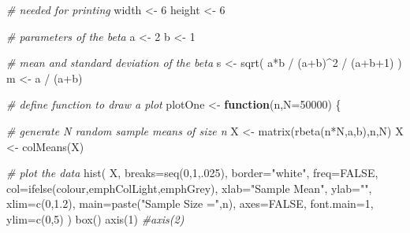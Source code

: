 \documentclass[
]{book}
\newenvironment{Shaded}{\begin{snugshade}}{\end{snugshade}}
\newcommand{\AttributeTok}[1]{\textcolor[rgb]{0.77,0.63,0.00}{#1}}
\newcommand{\CommentTok}[1]{\textcolor[rgb]{0.56,0.35,0.01}{\textit{#1}}}
\newcommand{\ConstantTok}[1]{\textcolor[rgb]{0.00,0.00,0.00}{#1}}
\newcommand{\ControlFlowTok}[1]{\textcolor[rgb]{0.13,0.29,0.53}{\textbf{#1}}}
\newcommand{\DecValTok}[1]{\textcolor[rgb]{0.00,0.00,0.81}{#1}}
\newcommand{\FloatTok}[1]{\textcolor[rgb]{0.00,0.00,0.81}{#1}}
\newcommand{\FunctionTok}[1]{\textcolor[rgb]{0.00,0.00,0.00}{#1}}
\newcommand{\NormalTok}[1]{#1}
\newcommand{\OtherTok}[1]{\textcolor[rgb]{0.56,0.35,0.01}{#1}}
\newcommand{\SpecialCharTok}[1]{\textcolor[rgb]{0.00,0.00,0.00}{#1}}
\newcommand{\StringTok}[1]{\textcolor[rgb]{0.31,0.60,0.02}{#1}}
\begin{document}
\begin{Shaded}
\begin{Highlighting}[]
    \CommentTok{\# needed for printing}
\NormalTok{    width }\OtherTok{\textless{}{-}} \DecValTok{6}
\NormalTok{    height }\OtherTok{\textless{}{-}} \DecValTok{6} 
    
    \CommentTok{\# parameters of the beta}
\NormalTok{    a }\OtherTok{\textless{}{-}} \DecValTok{2}
\NormalTok{    b }\OtherTok{\textless{}{-}} \DecValTok{1}
    
    \CommentTok{\# mean and standard deviation of the beta}
\NormalTok{    s }\OtherTok{\textless{}{-}} \FunctionTok{sqrt}\NormalTok{( a}\SpecialCharTok{*}\NormalTok{b }\SpecialCharTok{/}\NormalTok{ (a}\SpecialCharTok{+}\NormalTok{b)}\SpecialCharTok{\^{}}\DecValTok{2} \SpecialCharTok{/}\NormalTok{ (a}\SpecialCharTok{+}\NormalTok{b}\SpecialCharTok{+}\DecValTok{1}\NormalTok{) )}
\NormalTok{    m }\OtherTok{\textless{}{-}}\NormalTok{ a }\SpecialCharTok{/}\NormalTok{ (a}\SpecialCharTok{+}\NormalTok{b)}
    
    \CommentTok{\# define function to draw a plot}
\NormalTok{    plotOne }\OtherTok{\textless{}{-}} \ControlFlowTok{function}\NormalTok{(n,}\AttributeTok{N=}\DecValTok{50000}\NormalTok{) \{}
        
        \CommentTok{\# generate N random sample means of size n}
\NormalTok{        X }\OtherTok{\textless{}{-}} \FunctionTok{matrix}\NormalTok{(}\FunctionTok{rbeta}\NormalTok{(n}\SpecialCharTok{*}\NormalTok{N,a,b),n,N)}
\NormalTok{        X }\OtherTok{\textless{}{-}} \FunctionTok{colMeans}\NormalTok{(X)}
        
        \CommentTok{\# plot the data}
        \FunctionTok{hist}\NormalTok{( X, }\AttributeTok{breaks=}\FunctionTok{seq}\NormalTok{(}\DecValTok{0}\NormalTok{,}\DecValTok{1}\NormalTok{,.}\DecValTok{025}\NormalTok{), }\AttributeTok{border=}\StringTok{"white"}\NormalTok{, }\AttributeTok{freq=}\ConstantTok{FALSE}\NormalTok{,}
            \AttributeTok{col=}\FunctionTok{ifelse}\NormalTok{(colour,emphColLight,emphGrey),}
            \AttributeTok{xlab=}\StringTok{"Sample Mean"}\NormalTok{, }\AttributeTok{ylab=}\StringTok{""}\NormalTok{, }\AttributeTok{xlim=}\FunctionTok{c}\NormalTok{(}\DecValTok{0}\NormalTok{,}\FloatTok{1.2}\NormalTok{),}
            \AttributeTok{main=}\FunctionTok{paste}\NormalTok{(}\StringTok{"Sample Size ="}\NormalTok{,n), }\AttributeTok{axes=}\ConstantTok{FALSE}\NormalTok{,}
            \AttributeTok{font.main=}\DecValTok{1}\NormalTok{, }\AttributeTok{ylim=}\FunctionTok{c}\NormalTok{(}\DecValTok{0}\NormalTok{,}\DecValTok{5}\NormalTok{)}
\NormalTok{        )}
        \FunctionTok{box}\NormalTok{()}
        \FunctionTok{axis}\NormalTok{(}\DecValTok{1}\NormalTok{)}
        \CommentTok{\#axis(2)}
        

\end{Highlighting}
\end{Shaded}
\end{document}

